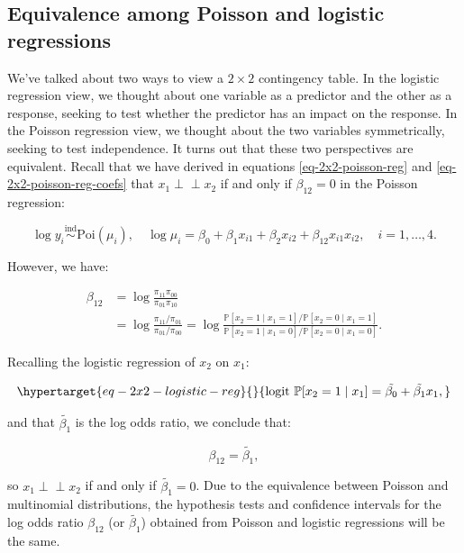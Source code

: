 \documentclass[
  11pt,
  letterpaper,
  oneside]{book}
\theoremstyle{plain}
\theoremstyle{plain}
\theoremstyle{definition}
\theoremstyle{definition}
\theoremstyle{plain}
\theoremstyle{remark}
\begin{document}
\hypertarget{sec-poisson-logistic-equivalence}{%
\subsection{Equivalence among Poisson and logistic
regressions}\label{sec-poisson-logistic-equivalence}}

We've talked about two ways to view a \(2 \times 2\) contingency table.
In the logistic regression view, we thought about one variable as a
predictor and the other as a response, seeking to test whether the
predictor has an impact on the response. In the Poisson regression view,
we thought about the two variables symmetrically, seeking to test
independence. It turns out that these two perspectives are equivalent.
Recall that we have derived in equations \ref{eq-2x2-poisson-reg} and
\ref{eq-2x2-poisson-reg-coefs} that \(x_1 \perp \!\!\! \perp x_2\) if
and only if \(\beta_{12} = 0\) in the Poisson regression:

\[
\log y_i \overset{\text{ind}}{\sim} \text{Poi}(\mu_i), \quad \log \mu_i = \beta_0 + \beta_1 x_{i1} + \beta_2 x_{i2} + \beta_{12} x_{i1}x_{i2}, \quad i = 1, \dots, 4.
\]

However, we have:

\[
\begin{split}
\beta_{12} &= \log \frac{\pi_{11}\pi_{00}}{\pi_{01}\pi_{10}} \\
&= \log \frac{\pi_{11}/\pi_{01}}{\pi_{01}/\pi_{00}} = \log \frac{\mathbb{P}[x_2 = 1 \mid x_1 = 1] / \mathbb{P}[x_2 = 0 \mid x_1 = 1]}{\mathbb{P}[x_2 = 1 \mid x_1 = 0] / \mathbb{P}[x_2 = 0 \mid x_1 = 0]}.
\end{split}
\]

Recalling the logistic regression of \(x_2\) on \(x_1\):

\begin{equation}\protect\hypertarget{eq-2x2-logistic-reg}{}{
\text{logit } \mathbb{P}[x_2 = 1 \mid x_1] = \tilde{\beta_0} + \tilde{\beta_1} x_1,
}\label{eq-2x2-logistic-reg}\end{equation}

and that \(\tilde{\beta_1}\) is the log odds ratio, we conclude that:

\[
\beta_{12} = \tilde{\beta_1},
\]

so \(x_1 \perp \!\!\! \perp x_2\) if and only if
\(\tilde{\beta_1} = 0\). Due to the equivalence between Poisson and
multinomial distributions, the hypothesis tests and confidence intervals
for the log odds ratio \(\beta_{12}\) (or \(\tilde{\beta_1}\)) obtained
from Poisson and logistic regressions will be the same.
\end{document}

